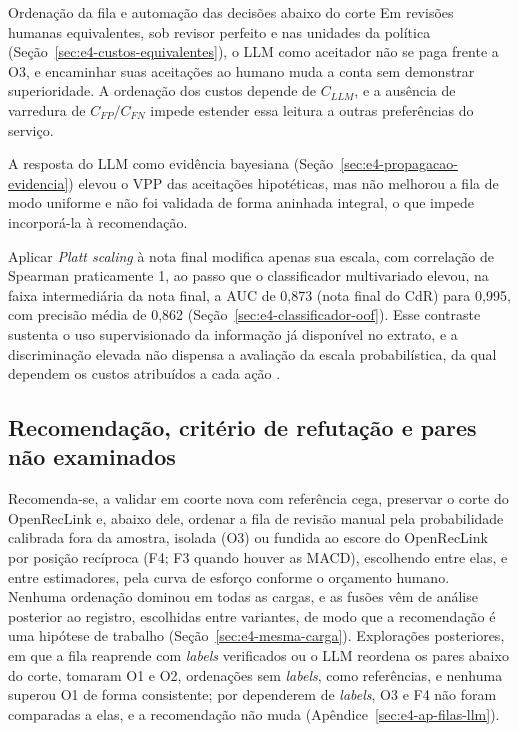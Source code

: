 \begin{chapter}{Ordenação da fila e automação das decisões abaixo do corte}
Em revisões humanas equivalentes, sob revisor perfeito e nas unidades da política (Seção~\ref{sec:e4-custos-equivalentes}), o LLM como aceitador não se paga frente a O3, e encaminhar suas aceitações ao humano muda a conta sem demonstrar superioridade. A ordenação dos custos depende de $C_{LLM}$, e a ausência de varredura de $C_{FP}/C_{FN}$ impede estender essa leitura a outras preferências do serviço.

A resposta do LLM como evidência bayesiana (Seção~\ref{sec:e4-propagacao-evidencia}) elevou o VPP das aceitações hipotéticas, mas não melhorou a fila de modo uniforme e não foi validada de forma aninhada integral, o que impede incorporá-la à recomendação.

Aplicar \textit{Platt scaling} à nota final modifica apenas sua escala, com correlação de Spearman praticamente 1, ao passo que o classificador multivariado elevou, na faixa intermediária da nota final, a AUC de 0,873 (nota final do CdR) para 0,995, com precisão média de 0,862 (Seção~\ref{sec:e4-classificador-oof}). Esse contraste sustenta o uso supervisionado da informação já disponível no extrato, e a discriminação elevada não dispensa a avaliação da escala probabilística, da qual dependem os custos atribuídos a cada ação \cite{Jardim2026phdrepo}.

\subsection{Recomendação, critério de refutação e pares não examinados}\label{sec:e4-recomendacao}

Recomenda-se, a validar em coorte nova com referência cega, preservar o corte do OpenRecLink e, abaixo dele, ordenar a fila de revisão manual pela probabilidade calibrada fora da amostra, isolada (O3) ou fundida ao escore do OpenRecLink por posição recíproca (F4; F3 quando houver as MACD), escolhendo entre elas, e entre estimadores, pela curva de esforço conforme o orçamento humano. Nenhuma ordenação dominou em todas as cargas, e as fusões vêm de análise posterior ao registro, escolhidas entre variantes, de modo que a recomendação é uma hipótese de trabalho (Seção~\ref{sec:e4-mesma-carga}). Explorações posteriores, em que a fila reaprende com \textit{labels} verificados ou o LLM reordena os pares abaixo do corte, tomaram O1 e O2, ordenações sem \textit{labels}, como referências, e nenhuma superou O1 de forma consistente; por dependerem de \textit{labels}, O3 e F4 não foram comparadas a elas, e a recomendação não muda (Apêndice~\ref{sec:e4-ap-filas-llm}).


\end{chapter}

